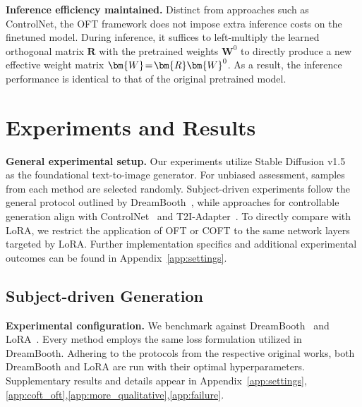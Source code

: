\textbf{Inference efficiency maintained.} Distinct from approaches such as ControlNet, the OFT framework does not impose extra inference costs on the finetuned model. During inference, it suffices to left-multiply the learned orthogonal matrix $\bm{R}$ with the pretrained weights $\bm{W}^0$ to directly produce a new effective weight matrix $\thickmuskip=2mu \medmuskip=2mu \bm{W}=\bm{R}\bm{W}^0$. As a result, the inference performance is identical to that of the original pretrained model.

\section{Experiments and Results}

\textbf{General experimental setup.} Our experiments utilize Stable Diffusion v1.5~\cite{rombach2022high} as the foundational text-to-image generator. For unbiased assessment, samples from each method are selected randomly. Subject-driven experiments follow the general protocol outlined by DreamBooth~\cite{ruiz2023dreambooth}, while approaches for controllable generation align with ControlNet~\cite{zhang2023adding} and T2I-Adapter~\cite{mou2023t2i}. To directly compare with LoRA, we restrict the application of OFT or COFT to the same network layers targeted by LoRA. Further implementation specifics and additional experimental outcomes can be found in Appendix~\ref{app:settings}.

\subsection{Subject-driven Generation}

\textbf{Experimental configuration.} We benchmark against DreamBooth~\cite{ruiz2023dreambooth} and LoRA~\cite{hulora2022}. Every method employs the same loss formulation utilized in DreamBooth. Adhering to the protocols from the respective original works, both DreamBooth and LoRA are run with their optimal hyperparameters. Supplementary results and details appear in Appendix~\ref{app:settings},\ref{app:coft_oft},\ref{app:more_qualitative},\ref{app:failure}.

